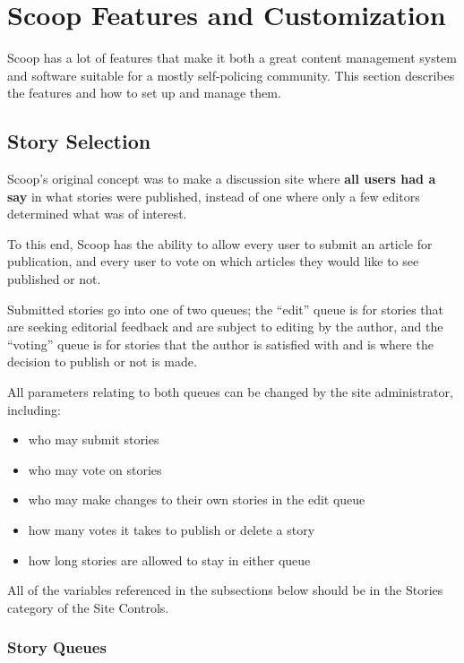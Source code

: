\section{Scoop Features and Customization}
\label{features}

Scoop has a lot of features that make it both a great content management system and software suitable for a mostly self-policing community.  This section describes the features and how to set up and manage them.

\subsection{Story Selection}
\label{features-modsub}

Scoop's original concept was to make a discussion site where {\bf all users had a say} in what stories were published, instead of one where only a few editors determined what was of interest.

To this end, Scoop has the ability to allow every user to submit an article for publication, and every user to vote on which articles they would like to see published or not.  

Submitted stories go into one of two queues; the ``edit'' queue is for stories that are seeking editorial feedback and are subject to editing by the author, and the ``voting'' queue is for stories that the author is satisfied with and is where the decision to publish or not is made.

All parameters relating to both queues can be changed by the site administrator, including:
\begin{itemize}
\item who may submit stories
\item who may vote on stories
\item who may make changes to their own stories in the edit queue
\item how many votes it takes to publish or delete a story
\item how long stories are allowed to stay in either queue
\end{itemize}

All of the variables referenced in the subsections below should be in the Stories category of the Site Controls.

\subsubsection{Story Queues}
\label{moderation-queues}

